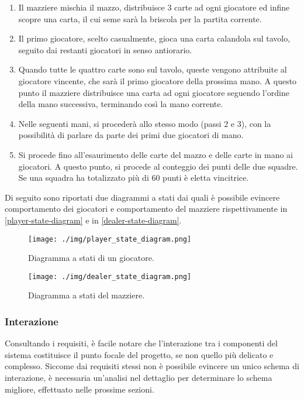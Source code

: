 \documentclass[a4paper,12pt]{article}
\begin{document}
\begin{enumerate}
	\item Il mazziere mischia il mazzo, distribuisce 3 carte ad ogni giocatore ed infine scopre una carta, il cui seme sarà la briscola per la partita corrente.
	\item Il primo giocatore, scelto casualmente, gioca una carta calandola sul tavolo, seguito dai restanti giocatori in senso antiorario.
	\item Quando tutte le quattro carte sono sul tavolo, queste vengono attribuite al giocatore vincente, che sarà il primo giocatore della prossima mano. A questo punto il mazziere distribuisce una carta ad ogni giocatore seguendo l'ordine della mano successiva, terminando così la mano corrente.
	\item Nelle seguenti mani, si procederà allo stesso modo (passi 2 e 3), con la possibilità di parlare da parte dei primi due giocatori di mano.
	\item Si procede fino all'esaurimento delle carte del mazzo e delle carte in mano ai giocatori. A questo punto, si procede al conteggio dei punti delle due squadre. Se una squadra ha totalizzato più di 60 punti è eletta vincitrice.
\end{enumerate}

Di seguito sono riportati due diagrammi a stati dai quali è possibile evincere comportamento dei giocatori e comportamento del mazziere rispettivamente in \autoref{player-state-diagram} e in \autoref{dealer-state-diagram}.

\begin{figure}[H]
	\centering
	\texttt{[image: ./img/player\_state\_diagram.png]}
	\caption{Diagramma a stati di un giocatore.  \label{player-state-diagram}}
\end{figure}


\begin{figure}[H]
	\hspace*{-0.7in}
	\centering
	\texttt{[image: ./img/dealer\_state\_diagram.png]}
	\caption{Diagramma a stati del mazziere.  \label{dealer-state-diagram}}
\end{figure}

\subsubsection{Interazione}

Consultando i requisiti, è facile notare che l'interazione tra i componenti del sistema costituisce il punto focale del progetto, se non quello più delicato e complesso. Siccome dai requisiti stessi non è possibile evincere un unico schema di interazione, è necessaria un'analisi nel dettaglio per determinare lo schema migliore, effettuato nelle prossime sezioni.  
\end{document}
